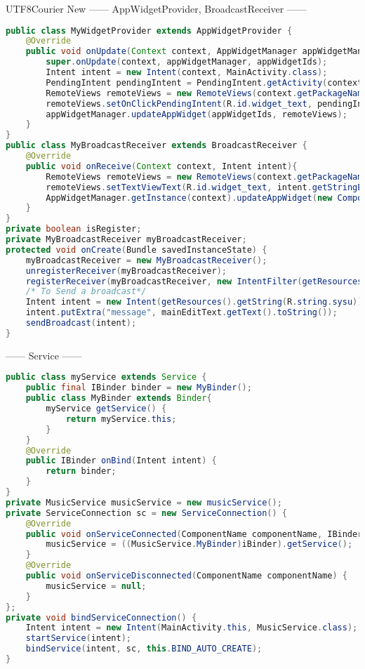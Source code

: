 \documentclass[10pt,a4paper,twocolumn]{report}
\begin{document}
\begin{CJK}{UTF8}{Courier New}
------ AppWidgetProvider, BroadcastReceiver ------
\begin{lstlisting}[language=Java]
public class MyWidgetProvider extends AppWidgetProvider {
	@Override
	public void onUpdate(Context context, AppWidgetManager appWidgetManager, int[] appWidgetIds){
		super.onUpdate(context, appWidgetManager, appWidgetIds);
		Intent intent = new Intent(context, MainActivity.class);
		PendingIntent pendingIntent = PendingIntent.getActivity(context, 0, intent, 0);
		RemoteViews remoteViews = new RemoteViews(context.getPackageName(), R.layout.widget_layout);
		remoteViews.setOnClickPendingIntent(R.id.widget_text, pendingIntent);
		appWidgetManager.updateAppWidget(appWidgetIds, remoteViews);
	}
}
public class MyBroadcastReceiver extends BroadcastReceiver {
	@Override
	public void onReceive(Context context, Intent intent){
		RemoteViews remoteViews = new RemoteViews(context.getPackageName(), R.layout.widget_layout);
		remoteViews.setTextViewText(R.id.widget_text, intent.getStringExtra("message"));
		AppWidgetManager.getInstance(context).updateAppWidget(new ComponentName(context.getApplicationContext(),MyWidgetProvider.class), remoteViews);
	}
}
private boolean isRegister;
private MyBroadcastReceiver myBroadcastReceiver;
protected void onCreate(Bundle savedInstanceState) {
	myBroadcastReceiver = new MyBroadcastReceiver();
	unregisterReceiver(myBroadcastReceiver);
	registerReceiver(myBroadcastReceiver, new IntentFilter(getResources().getString(R.string.sysu)));
	/* To Send a broadcast*/
	Intent intent = new Intent(getResources().getString(R.string.sysu));
	intent.putExtra("message", mainEditText.getText().toString());
	sendBroadcast(intent);
}
\end{lstlisting}

------ Service ------
\begin{lstlisting}[language=Java]
public class myService extends Service {
	public final IBinder binder = new MyBinder();
	public class MyBinder extends Binder{
		myService getService() {
			return myService.this;
		}
	}
	@Override
	public IBinder onBind(Intent intent) {
		return binder;
	}
}
private MusicService musicService = new musicService();
private ServiceConnection sc = new ServiceConnection() {
	@Override
	public void onServiceConnected(ComponentName componentName, IBinder iBinder) {
		musicService = ((MusicService.MyBinder)iBinder).getService();
	}
	@Override
	public void onServiceDisconnected(ComponentName componentName) {
		musicService = null;
	}
};
private void bindServiceConnection() {
	Intent intent = new Intent(MainActivity.this, MusicService.class);
	startService(intent);
	bindService(intent, sc, this.BIND_AUTO_CREATE);
}
\end{lstlisting}


\end{CJK}
\end{document}
